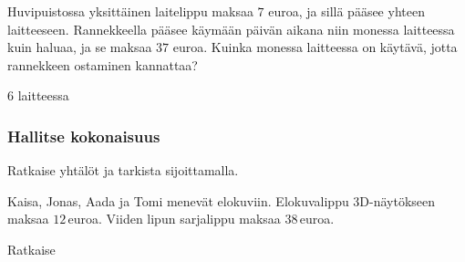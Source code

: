 \begin{tehtavasivu}
\begin{tehtava}
Huvipuistossa yksittäinen laitelippu maksaa $7$ euroa, ja sillä pääsee yhteen laitteeseen. Rannekkeella pääsee käymään päivän aikana niin monessa laitteessa kuin haluaa, ja se maksaa $37$ euroa. Kuinka monessa laitteessa on käytävä, jotta rannekkeen ostaminen kannattaa?
	\begin{vastaus}
$6$ laitteessa
	\end{vastaus}
\end{tehtava}

\subsubsection*{Hallitse kokonaisuus}

\begin{tehtava}
Ratkaise yhtälöt ja tarkista sijoittamalla.
\begin{vastaus}
\end{vastaus}
\end{tehtava}


\begin{tehtava}
Kaisa, Jonas, Aada ja Tomi menevät elokuviin. Elokuvalippu 3D-näytökseen maksaa $12$\,euroa. Viiden lipun sarjalippu maksaa $38$\,euroa.

\begin{vastaus}
\end{vastaus}
\end{tehtava}

\begin{tehtava}
Ratkaise

\begin{vastaus}
\end{vastaus}
\end{tehtava}



\end{tehtavasivu}
